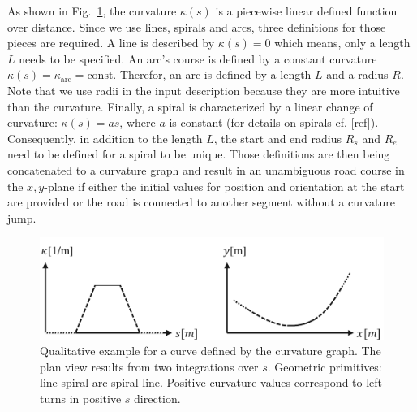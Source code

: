 \documentclass[a4paper, 10pt, conference]{ieeeconf}      %
\begin{document}
As shown in Fig.~\ref{fig_curvGraph}, the curvature $\kappa(s)$ is a piecewise linear defined function over distance. Since we use lines, spirals and arcs, three definitions for those pieces are required. A line is described by $\kappa(s) = 0$ which means, only a length $L$ needs to be specified. An arc's course is defined by a constant curvature $\kappa(s) = \kappa_\text{arc} = \text{const}$. Therefor, an arc is defined by a length $L$ and a radius $R$. Note that we use radii in the input description because they are more intuitive than the curvature. Finally, a spiral is characterized by a linear change of curvature: $\kappa(s) = a s$, where $a$ is constant (for details on spirals cf. [ref]). Consequently, in addition to the length $L$, the start and end radius $R_s$ and $R_e$ need to be defined for a spiral to be unique. Those definitions are then being concatenated to a curvature graph and result in an unambiguous road course in the $x,y$-plane if either the initial values for position and orientation at the start are provided or the road is connected to another segment without a curvature jump.

\begin{figure}%
	\centering
	\includegraphics{fig/curvGraph.pdf}
	\caption{Qualitative example for a curve defined by the curvature graph. The plan view results from two integrations over $s$. Geometric primitives: line-spiral-arc-spiral-line. Positive curvature values correspond to left turns in positive $s$ direction.}
	\label{fig_curvGraph}
\end{figure}
\end{document}
